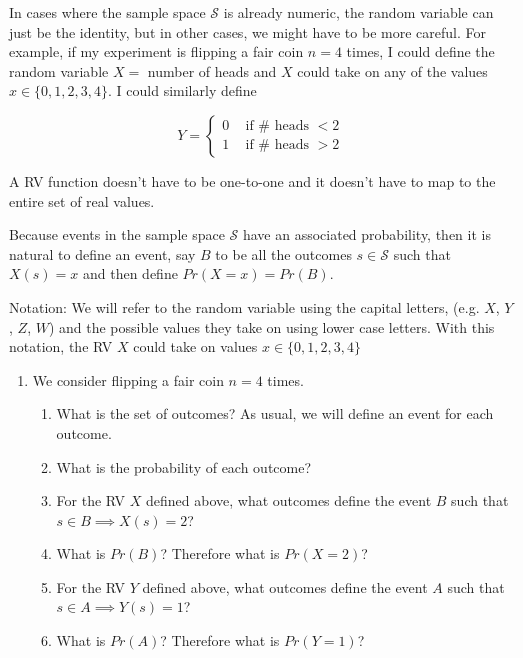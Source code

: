 \documentclass[]{book}
\providecommand{\tightlist}{%
  \setlength{\itemsep}{0pt}\setlength{\parskip}{0pt}}
\begin{document}
In cases where the sample space \(\mathcal{S}\) is already numeric, the
random variable can just be the identity, but in other cases, we might
have to be more careful. For example, if my experiment is flipping a
fair coin \(n=4\) times, I could define the random variable \(X=\)
number of heads and \(X\) could take on any of the values
\(x \in \{0,1,2,3,4\}\). I could similarly define

\[Y= \begin{cases} 
  0 \;\;\; \textrm{ if # heads } < 2 \\ 
  1 \;\;\; \textrm{ if # heads } > 2 
\end{cases}\]

A RV function doesn't have to be one-to-one and it doesn't have to map
to the entire set of real values.

Because events in the sample space \(\mathcal{S}\) have an associated
probability, then it is natural to define an event, say \(B\) to be all
the outcomes \(s \in \mathcal{S}\) such that \(X(s) = x\) and then
define \(Pr(X=x) = Pr(B)\).

Notation: We will refer to the random variable using the capital
letters, (e.g. \(X\), \(Y\), \(Z\), \(W\)) and the possible values they
take on using lower case letters. With this notation, the RV \(X\) could
take on values \(x \in \{0,1,2,3,4\}\)

\begin{enumerate}
\def\labelenumi{\arabic{enumi}.}
\tightlist
\item
  We consider flipping a fair coin \(n=4\) times.

  \begin{enumerate}
  \def\labelenumii{\alph{enumii})}
  \tightlist
  \item
    What is the set of outcomes? As usual, we will define an event for
    each outcome.
  \item
    What is the probability of each outcome?
  \item
    For the RV \(X\) defined above, what outcomes define the event \(B\)
    such that \(s \in B \implies X(s)=2\)?
  \item
    What is \(Pr(B)\)? Therefore what is \(Pr(X=2)\)?
  \item
    For the RV \(Y\) defined above, what outcomes define the event \(A\)
    such that \(s \in A \implies Y(s)=1\)?
  \item
    What is \(Pr(A)\)? Therefore what is \(Pr(Y=1)\)?
  \end{enumerate}
\end{enumerate}
\end{document}
